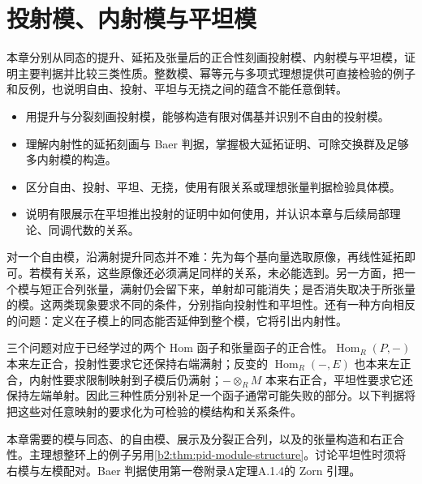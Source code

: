 
\chapter{投射模、内射模与平坦模}
\label{b2:ch:07}

\begin{chapterabstract}
	本章分别从同态的提升、延拓及张量后的正合性刻画投射模、内射模与平坦模，证明主要判据并比较三类性质。整数模、幂等元与多项式理想提供可直接检验的例子和反例，也说明自由、投射、平坦与无挠之间的蕴含不能任意倒转。
\end{chapterabstract}

\begin{learninggoals}
	\begin{itemize}
		\item 用提升与分裂刻画投射模，能够构造有限对偶基并识别不自由的投射模。
		\item 理解内射性的延拓刻画与 Baer 判据，掌握极大延拓证明、可除交换群及足够多内射模的构造。
		\item 区分自由、投射、平坦、无挠，使用有限关系或理想张量判据检验具体模。
		\item 说明有限展示在平坦推出投射的证明中如何使用，并认识本章与后续局部理论、同调代数的关系。
	\end{itemize}
\end{learninggoals}

对一个自由模，沿满射提升同态并不难：先为每个基向量选取原像，再线性延拓即可。若模有关系，这些原像还必须满足同样的关系，未必能选到。另一方面，把一个模与短正合列张量，满射仍会留下来，单射却可能消失；是否消失取决于所张量的模。这两类现象要求不同的条件，分别指向投射性和平坦性。还有一种方向相反的问题：定义在子模上的同态能否延伸到整个模，它将引出内射性。

\ProseParagraphBreak

三个问题对应于已经学过的两个 Hom 函子和张量函子的正合性。\(\operatorname{Hom}_R(P,-)\) 本来左正合，投射性要求它还保持右端满射；反变的 \(\operatorname{Hom}_R(-,E)\) 也本来左正合，内射性要求限制映射到子模后仍满射；\(-\otimes_RM\) 本来右正合，平坦性要求它还保持左端单射。因此三种性质分别补足一个函子通常可能失败的部分。以下判据将把这些对任意映射的要求化为可检验的模结构和关系条件。

\ProseParagraphBreak

本章需要的模与同态、的自由模、展示及分裂正合列，以及的张量构造和右正合性。主理想整环上的例子另用\cref{b2:thm:pid-module-structure}。讨论平坦性时须将右模与左模配对。Baer 判据使用第一卷附录A定理A.1.4的 Zorn 引理。

